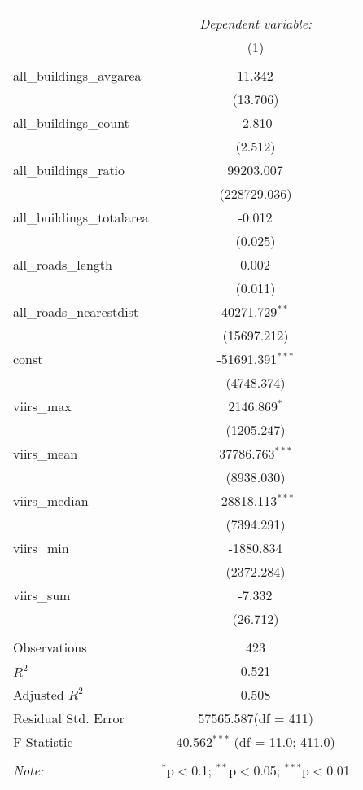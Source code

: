 \begin{table}[!htbp] \centering
\begin{tabular}{@{\extracolsep{5pt}}lc}
\\[-1.8ex]\hline
\hline \\[-1.8ex]
& \multicolumn{1}{c}{\textit{Dependent variable:}} \
\cr \cline{1-2}
\\[-1.8ex] & (1) \\
\hline \\[-1.8ex]
 all_buildings_avgarea & 11.342$^{}$ \\
  & (13.706) \\
 all_buildings_count & -2.810$^{}$ \\
  & (2.512) \\
 all_buildings_ratio & 99203.007$^{}$ \\
  & (228729.036) \\
 all_buildings_totalarea & -0.012$^{}$ \\
  & (0.025) \\
 all_roads_length & 0.002$^{}$ \\
  & (0.011) \\
 all_roads_nearestdist & 40271.729$^{**}$ \\
  & (15697.212) \\
 const & -51691.391$^{***}$ \\
  & (4748.374) \\
 viirs_max & 2146.869$^{*}$ \\
  & (1205.247) \\
 viirs_mean & 37786.763$^{***}$ \\
  & (8938.030) \\
 viirs_median & -28818.113$^{***}$ \\
  & (7394.291) \\
 viirs_min & -1880.834$^{}$ \\
  & (2372.284) \\
 viirs_sum & -7.332$^{}$ \\
  & (26.712) \\
\hline \\[-1.8ex]
 Observations & 423 \\
 $R^2$ & 0.521 \\
 Adjusted $R^2$ & 0.508 \\
 Residual Std. Error & 57565.587(df = 411)  \\
 F Statistic & 40.562$^{***}$ (df = 11.0; 411.0) \\
\hline
\hline \\[-1.8ex]
\textit{Note:} & \multicolumn{1}{r}{$^{*}$p$<$0.1; $^{**}$p$<$0.05; $^{***}$p$<$0.01} \\
\end{tabular}
\end{table}